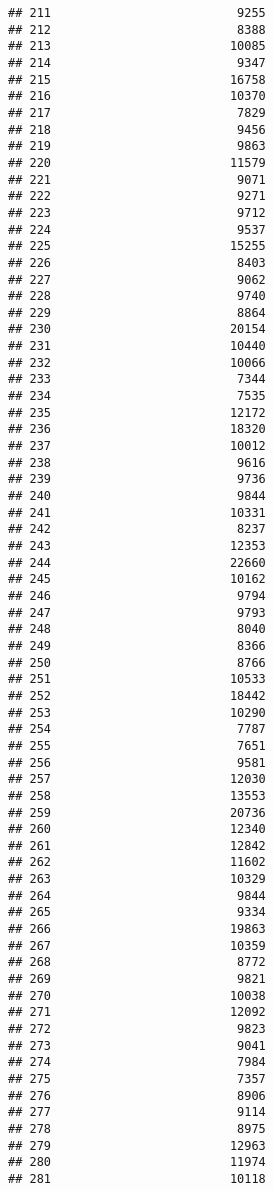 \documentclass[
]{article}
\begin{document}
\begin{verbatim}
## 211                          9255
## 212                          8388
## 213                         10085
## 214                          9347
## 215                         16758
## 216                         10370
## 217                          7829
## 218                          9456
## 219                          9863
## 220                         11579
## 221                          9071
## 222                          9271
## 223                          9712
## 224                          9537
## 225                         15255
## 226                          8403
## 227                          9062
## 228                          9740
## 229                          8864
## 230                         20154
## 231                         10440
## 232                         10066
## 233                          7344
## 234                          7535
## 235                         12172
## 236                         18320
## 237                         10012
## 238                          9616
## 239                          9736
## 240                          9844
## 241                         10331
## 242                          8237
## 243                         12353
## 244                         22660
## 245                         10162
## 246                          9794
## 247                          9793
## 248                          8040
## 249                          8366
## 250                          8766
## 251                         10533
## 252                         18442
## 253                         10290
## 254                          7787
## 255                          7651
## 256                          9581
## 257                         12030
## 258                         13553
## 259                         20736
## 260                         12340
## 261                         12842
## 262                         11602
## 263                         10329
## 264                          9844
## 265                          9334
## 266                         19863
## 267                         10359
## 268                          8772
## 269                          9821
## 270                         10038
## 271                         12092
## 272                          9823
## 273                          9041
## 274                          7984
## 275                          7357
## 276                          8906
## 277                          9114
## 278                          8975
## 279                         12963
## 280                         11974
## 281                         10118

\end{verbatim}
\end{document}
